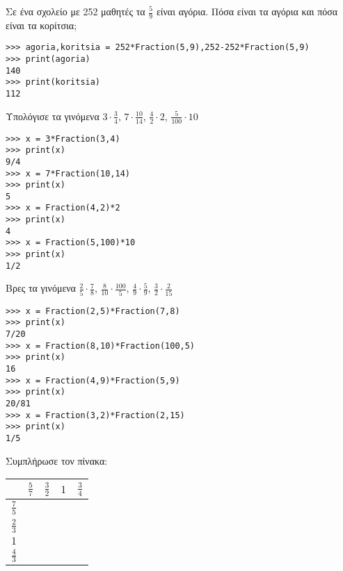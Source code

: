 \begin{exercise}Σε ένα σχολείο με 252 μαθητές τα $\frac{5}{9}$ είναι αγόρια. Πόσα είναι τα αγόρια και πόσα είναι τα κορίτσια;
\end{exercise}

\begin{lstlisting}    
>>> agoria,koritsia = 252*Fraction(5,9),252-252*Fraction(5,9)
>>> print(agoria)
140
>>> print(koritsia)
112
\end{lstlisting}

\begin{exercise}Υπολόγισε τα γινόμενα $3\cdot\frac{3}{4}$, $7\cdot\frac{10}{14}$, $\frac{4}{2}\cdot 2$, $\frac{5}{100}\cdot 10$\end{exercise}

\begin{lstlisting}
>>> x = 3*Fraction(3,4)
>>> print(x)
9/4
>>> x = 7*Fraction(10,14)
>>> print(x)
5
>>> x = Fraction(4,2)*2
>>> print(x)
4
>>> x = Fraction(5,100)*10
>>> print(x)
1/2
\end{lstlisting}

\begin{exercise}
Βρες τα γινόμενα $\frac{2}{5}\cdot\frac{7}{8}$, $\frac{8}{10}\cdot\frac{100}{5}$, $\frac{4}{9}\cdot\frac{5}{9}$, $\frac{3}{2}\cdot\frac{2}{15}$
\end{exercise}

\begin{lstlisting}
>>> x = Fraction(2,5)*Fraction(7,8)
>>> print(x)
7/20
>>> x = Fraction(8,10)*Fraction(100,5)
>>> print(x)
16
>>> x = Fraction(4,9)*Fraction(5,9)
>>> print(x)
20/81
>>> x = Fraction(3,2)*Fraction(2,15)
>>> print(x)
1/5
\end{lstlisting}

\begin{exercise}
Συμπλήρωσε τον πίνακα:
\end{exercise}

\begin{table}
\begin{tabular}{|c|c|c|c|c|}
                                      & $\frac{5}{7}$& $\frac{3}{2}$& $1$& $\frac{3}{4}$\\\hline
$\frac{7}{5}$              &                         &                         &       &                         \\\hline
$\frac{2}{3}$              &                         &                         &       &                         \\\hline
$1$                                &                         &                         &       &                         \\\hline
$\frac{4}{3}$              &                         &                         &       &                         \\\hline
\end{tabular}
\end{table}


